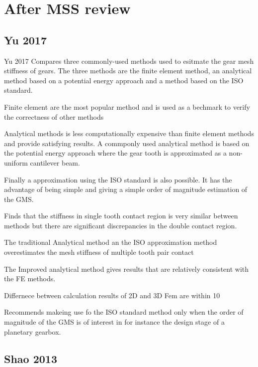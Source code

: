 \section{After MSS review}


\subsection{Yu 2017}
Yu 2017 Compares three commonly-used methods used to esitmate the gear mesh stiffness of gears. The three methods are the finite element method, an analytical method based on a potential energy approach and a method based on the ISO standard. 

Finite element are the most popular method and is used as a bechmark to verify the correctness of other methods

Analytical methods is less computationally expensive than finite element methods and provide satisfying results. A commponly used analytical method is based on the potential energy approach where the gear tooth is approximated as a non-uniform cantilever beam. 

Finally a approximation using the ISO standard is also possible. It has the advantage of being simple and giving a simple order of magnitude estimation of the GMS. 

Finds that the stiffness in single tooth contact region is very similar between methods  but there are significant discrepancies in the double contact region. 

The traditional Analytical method an the ISO approximation method overestimates the mesh stiffness of multiple tooth pair contact

The Improved analytical method gives results that are relatively consistent with the FE methods. 

Differnece between calculation results of 2D and 3D Fem are within 10%

Recommends makeing use fo the ISO standard method only when the order of magnitude of the GMS is of interest in for instance the design stage of a planetary gearbox. 


\subsection{Shao 2013}





